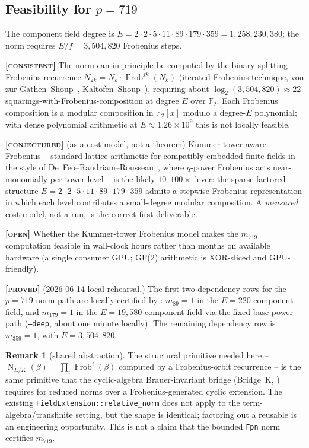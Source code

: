 \documentclass[11pt]{article}
\theoremstyle{plain}
\theoremstyle{definition}
\newtheorem{remark}{Remark}
\newcommand{\F}{\mathbb{F}}
\newcommand{\Norm}{\operatorname{N}}
\newcommand{\Frob}{\operatorname{Frob}}
\newcommand{\PROVED}{\textbf{[\textsc{proved}]}}
\newcommand{\CONSISTENT}{\textbf{[\textsc{consistent}]}}
\newcommand{\CONJECTURED}{\textbf{[\textsc{conjectured}]}}
\newcommand{\OPEN}{\textbf{[\textsc{open}]}}
\begin{document}
\subsection{Feasibility for $p=719$}

The component field degree is
$E=2\cdot2\cdot5\cdot11\cdot89\cdot179\cdot359=1{,}258{,}230{,}380$; the
norm requires $E/f=3{,}504{,}820$ Frobenius steps.

\CONSISTENT{} The norm can in principle be computed by the
binary-splitting Frobenius recurrence
$N_{2k}=N_k\cdot\Frob^{fk}(N_k)$ (iterated-Frobenius technique, von zur
Gathen--Shoup~\cite{vzGS92}, Kaltofen--Shoup~\cite{KS98}), requiring about
$\log_2(3{,}504{,}820)\approx22$ squarings-with-Frobenius-composition at
degree $E$ over $\F_2$. Each Frobenius composition is a modular
composition in $\F_2[x]$ modulo a degree-$E$ polynomial; with dense
polynomial arithmetic at $E\approx1.26\times10^9$ this is not locally
feasible.

\CONJECTURED{} (as a cost model, not a theorem) Kummer-tower-aware
Frobenius -- standard-lattice arithmetic for compatibly embedded finite
fields in the style of De~Feo--Randriam--Rousseau~\cite{DFRR19}, where
$q$-power Frobenius acts near-monomially per tower level -- is the likely
$10$--$100\times$ lever: the sparse factored structure
$E=2\cdot2\cdot5\cdot11\cdot89\cdot179\cdot359$ admits a stepwise
Frobenius representation in which each level contributes a small-degree
modular composition. A \emph{measured} cost model, not a run, is the
correct first deliverable.

\OPEN{} Whether the Kummer-tower Frobenius model makes the $m_{719}$
computation feasible in wall-clock hours rather than months on available
hardware (a single consumer GPU; GF(2) arithmetic is XOR-sliced and
GPU-friendly).

\PROVED{} (2026-06-14 local rehearsal.) The first two dependency rows for
the $p=719$ norm path are locally certified by
: $m_{89}=1$ in the
$E=220$ component field, and $m_{179}=1$ in the $E=19{,}580$ component
field via the fixed-base power path (\texttt{--deep}, about one minute
locally). The remaining dependency row is $m_{359}=1$, with
$E=3{,}504{,}820$.

\begin{remark}[shared abstraction]\label{rem:bridgek}
The structural primitive needed here --
$\Norm_{E/K}(\beta)=\prod_i\Frob^{i}(\beta)$ computed by a
Frobenius-orbit recurrence -- is the same primitive that the cyclic-algebra
Brauer-invariant bridge (Bridge~K, ) requires for
reduced norms over a Frobenius-generated cyclic extension. The existing
\texttt{FieldExtension::relative\_norm} does not apply to the
term-algebra/transfinite setting, but the shape is identical; factoring
out a reusable  is an
engineering opportunity. This is not a claim that the bounded
\texttt{Fpn} norm certifies $m_{719}$.
\end{remark}
\end{document}
